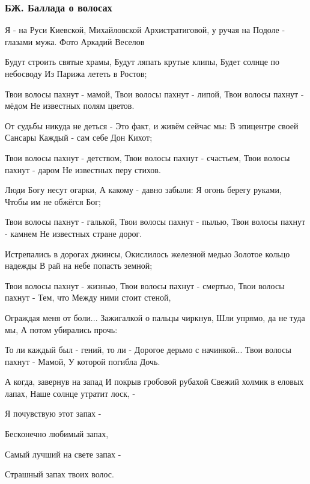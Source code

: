  
 
 

\subsubsection{БЖ. Баллада о волосах}

Я - на Руси Киевской, Михайловской Архистратиговой, у ручая на Подоле - глазами мужа. Фото Аркадий Веселов

Будут строить святые храмы,
Будут ляпать крутые клипы,
Будет солнце по небосводу
Из Парижа лететь в Ростов;

Твои волосы пахнут - мамой,
Твои волосы пахнут - липой,
Твои волосы пахнут - мёдом
Не известных полям цветов.

От судьбы никуда не деться -
Это факт, и живём сейчас мы:
В эпицентре своей Сансары
Каждый - сам себе Дон Кихот;

Твои волосы пахнут - детством,
Твои волосы пахнут - счастьем,
Твои волосы пахнут - даром
Не известных перу стихов.

Люди Богу несут огарки,
А какому - давно забыли:
Я огонь берегу руками,
Чтобы им не обжёгся Бог;

Твои волосы пахнут - галькой,
Твои волосы пахнут - пылью,
Твои волосы пахнут - камнем
Не известных стране дорог.

Истрепались в дорогах джинсы,
Окислилось железной медью
Золотое кольцо надежды
В рай на небе попасть земной;

Твои волосы пахнут - жизнью,
Твои волосы пахнут - смертью,
Твои волосы пахнут - Тем, что
Между ними стоит стеной,

Ограждая меня от боли...
Зажигалкой о пальцы чиркнув,
Шли упрямо, да не туда мы,
А потом убирались прочь:

То ли каждый был - гений, то ли -
Дорогое дерьмо с начинкой...
Твои волосы пахнут - Мамой,
У которой погибла Дочь.

А когда, завернув на запад
И покрыв гробовой рубахой
Свежий холмик в еловых лапах,
Наше солнце утратит лоск, -

Я почувствую этот запах -

Бесконечно любимый запах,

Самый лучший на свете запах -

Страшный запах твоих волос.
